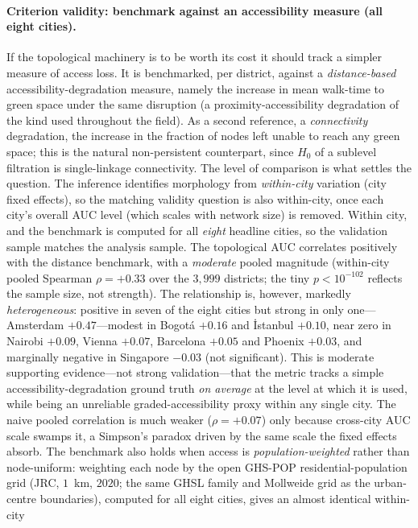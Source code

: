 \paragraph{Criterion validity: benchmark against an accessibility measure (all eight cities).} If the
topological machinery is to be worth its cost it should track a simpler measure of
access loss. It is benchmarked, per district, against a \emph{distance-based}
accessibility-degradation measure, namely the increase in mean walk-time to green
space under the same disruption (a proximity-accessibility degradation of the kind
used throughout the field). As a second reference, a \emph{connectivity}
degradation, the increase in the fraction of nodes left unable to reach any green
space; this is the natural non-persistent counterpart, since $H_0$ of a sublevel
filtration is single-linkage connectivity. The level of comparison is what settles
the question. The inference identifies morphology from \emph{within-city} variation
(city fixed effects), so the matching validity question is also within-city, once
each city's overall AUC level (which scales with network size) is removed. Within
city, and the benchmark is computed for all \emph{eight} headline cities, so the
validation sample matches the analysis sample. The topological AUC correlates
positively with the distance benchmark, with a \emph{moderate} pooled magnitude
(within-city pooled Spearman $\rho=+0.33$ over the $3{,}999$ districts; the tiny
$p<10^{-102}$ reflects the sample size, not strength). The relationship is, however,
markedly \emph{heterogeneous}: positive in seven of the eight cities but strong in
only one---Amsterdam $+0.47$---modest in Bogotá $+0.16$ and İstanbul $+0.10$, near
zero in Nairobi $+0.09$, Vienna $+0.07$, Barcelona $+0.05$ and Phoenix $+0.03$, and
marginally negative in Singapore $-0.03$ (not significant). This is moderate
supporting evidence---not strong validation---that the metric tracks a simple
accessibility-degradation ground truth \emph{on average} at the level at which it is
used, while being an unreliable graded-accessibility proxy within any single city. The naive pooled correlation is much
weaker ($\rho=+0.07$) only because cross-city AUC scale swamps it, a Simpson's
paradox driven by the same scale the fixed effects absorb. The benchmark also holds
when access is \emph{population-weighted} rather than node-uniform: weighting each
node by the open GHS-POP residential-population grid \citep{ghsl2023pop} (JRC,
$1$~km, $2020$; the same GHSL family and Mollweide grid as the urban-centre
boundaries), computed for all eight cities, gives an almost identical within-city
